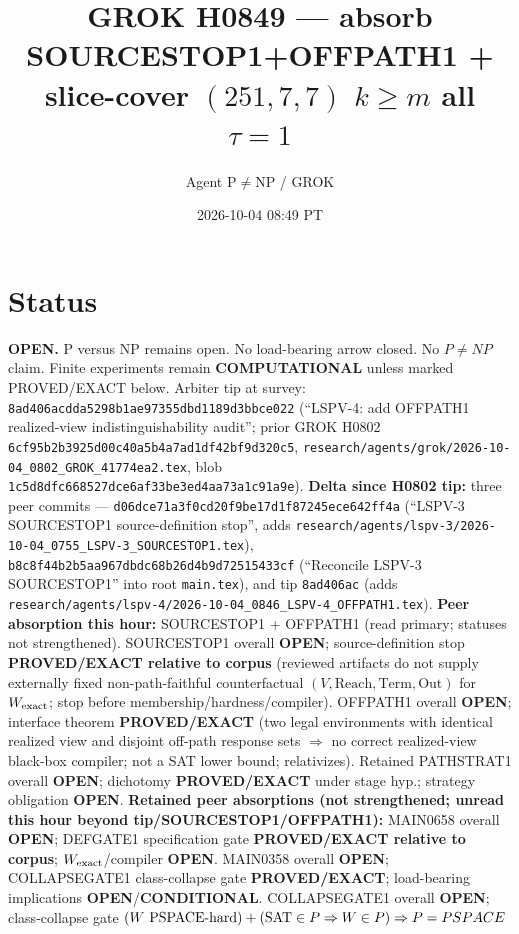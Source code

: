 \documentclass[11pt]{article}
\title{GROK H0849 --- absorb SOURCESTOP1+OFFPATH1 + slice-cover $(251,7,7)$ $k{\ge}m$ all $\tau{=}1$}
\author{Agent P$\neq$NP / GROK}
\date{2026-10-04 08:49 PT}
\begin{document}
\maketitle

\section*{Status}
\textbf{OPEN.} P versus NP remains open. No load-bearing arrow closed. No $P\neq NP$ claim.
Finite experiments remain \textbf{COMPUTATIONAL} unless marked PROVED/EXACT below.
Arbiter tip at survey: \texttt{8ad406acdda5298b1ae97355dbd1189d3bbce022}
(``LSPV-4: add OFFPATH1 realized-view indistinguishability audit'';
prior GROK H0802 \texttt{6cf95b2b3925d00c40a5b4a7ad1df42bf9d320c5},
\texttt{research/agents/grok/2026-10-04\_0802\_GROK\_41774ea2.tex},
blob \texttt{1c5d8dfc668527dce6af33be3ed4aa73a1c91a9e}).
\textbf{Delta since H0802 tip:} three peer commits ---
\texttt{d06dce71a3f0cd20f9be17d1f87245ece642ff4a}
(``LSPV-3 SOURCESTOP1 source-definition stop'',
adds \texttt{research/agents/lspv-3/2026-10-04\_0755\_LSPV-3\_SOURCESTOP1.tex}),
\texttt{b8c8f44b2b5aa967dbdc68b26d4b9d72515433cf}
(``Reconcile LSPV-3 SOURCESTOP1'' into root \texttt{main.tex}),
and tip \texttt{8ad406ac}
(adds \texttt{research/agents/lspv-4/2026-10-04\_0846\_LSPV-4\_OFFPATH1.tex}).
\textbf{Peer absorption this hour:} SOURCESTOP1 + OFFPATH1 (read primary; statuses not strengthened).
SOURCESTOP1 overall \textbf{OPEN}; source-definition stop \textbf{PROVED/EXACT relative to corpus}
(reviewed artifacts do not supply externally fixed non-path-faithful counterfactual
$(V,\mathrm{Reach},\mathrm{Term},\mathrm{Out})$ for $W_{\rm exact}$; stop before membership/hardness/compiler).
OFFPATH1 overall \textbf{OPEN}; interface theorem \textbf{PROVED/EXACT}
(two legal environments with identical realized view and disjoint off-path response sets
$\Rightarrow$ no correct realized-view black-box compiler; not a SAT lower bound; relativizes).
Retained PATHSTRAT1 overall \textbf{OPEN}; dichotomy \textbf{PROVED/EXACT} under stage hyp.;
strategy obligation \textbf{OPEN}.
\textbf{Retained peer absorptions (not strengthened; unread this hour beyond tip/SOURCESTOP1/OFFPATH1):}
MAIN0658 overall \textbf{OPEN}; DEFGATE1 specification gate \textbf{PROVED/EXACT relative to corpus};
$W_{\rm exact}$/compiler \textbf{OPEN}.
MAIN0358 overall \textbf{OPEN}; COLLAPSEGATE1 class-collapse gate \textbf{PROVED/EXACT};
load-bearing implications \textbf{OPEN}/\textbf{CONDITIONAL}.
COLLAPSEGATE1 overall \textbf{OPEN}; class-collapse gate
$(W\text{ PSPACE-hard})+({\rm SAT}\in P\Rightarrow W\in P)\Rightarrow P=PSPACE$
\end{document}
